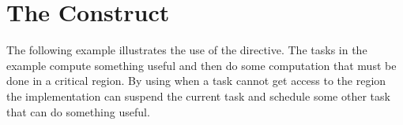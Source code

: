 \pagebreak
\chapter{The  Construct}
\label{chap:taskyield}

The following example illustrates the use of the   directive. 
The tasks in the example compute something useful and then do some computation 
that must be done in a critical region. By using  when a task 
cannot get access to the  region the implementation can suspend 
the current task and schedule some other task that can do something useful. 




